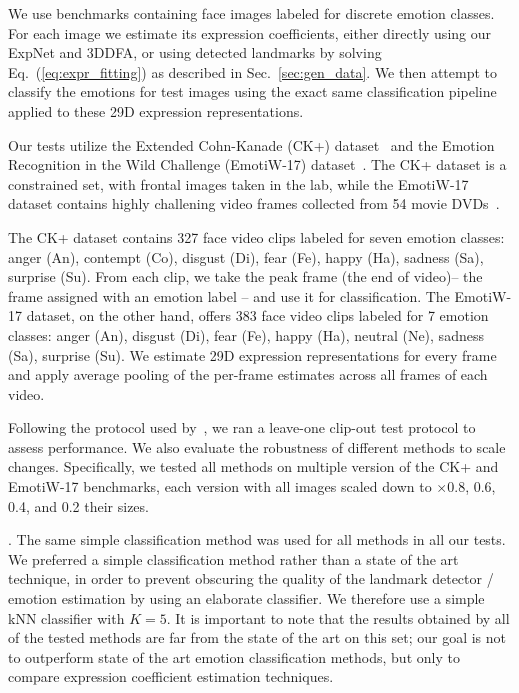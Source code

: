 \documentclass[a4paper, 10pt, conference]{ieeeconf}
\newcommand{\minisection}[1]{\vspace{2mm}\noindent{\bf #1}.}
\begin{document}
We use benchmarks containing face images labeled for discrete emotion classes. For each image we estimate its expression coefficients, either directly using our ExpNet and 3DDFA, or using detected landmarks by solving Eq.~(\ref{eq:expr_fitting}) as described in Sec.~\ref{sec:gen_data}. We then attempt to classify the emotions for test images using the exact same classification pipeline applied to these 29D expression representations.

Our tests utilize the Extended Cohn-Kanade (CK+) dataset~\cite{lucey2010extended} and the Emotion Recognition in the Wild Challenge (EmotiW-17) dataset~\cite{dhall2017individual}. The CK+ dataset is a constrained set, with frontal images taken in the lab, while the EmotiW-17 dataset contains highly challening video frames collected from 54 movie DVDs~\cite{dhall2012collecting}.

The CK+ dataset contains 327 face video clips labeled for seven emotion classes:
anger (An), contempt (Co), disgust (Di), fear (Fe), happy (Ha), sadness (Sa), surprise (Su). From each clip, we take the peak frame (the end of video)– the frame assigned with an emotion label – and use it for classification. The EmotiW-17 dataset, on the other hand, offers 383 face video clips labeled for 7 emotion classes: anger (An), disgust (Di), fear (Fe), happy (Ha), neutral (Ne), sadness (Sa), surprise (Su).  We estimate 29D expression representations for every frame and apply average pooling of the per-frame estimates across all frames of each video.

Following the protocol used by~\cite{lucey2010extended}, we ran a leave-one clip-out test protocol to assess performance. We also evaluate the robustness of different methods to scale changes. Specifically, we tested all methods on multiple version of the CK+ and EmotiW-17 benchmarks, each version with all images scaled down to $\times$0.8, 0.6, 0.4, and 0.2 their sizes.

\minisection{Emotion classification pipeline} The same simple classification method was used for all methods in all our tests. We preferred a simple classification method rather than a state of the art technique, in order to prevent obscuring the quality of the landmark detector / emotion estimation by using an elaborate classifier. We therefore use a simple kNN classifier with $K=5$. It is important to note that the results obtained by all of the tested methods are far from the state of the art on this set; our goal is not to outperform state of the art emotion classification methods, but only to compare expression coefficient estimation techniques.
\end{document}

